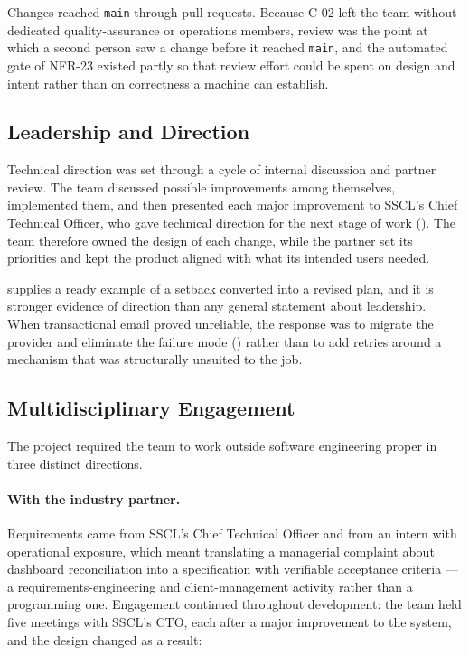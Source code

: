 Changes reached \texttt{main} through pull requests. Because C-02 left the team
without dedicated quality-assurance or operations members, review was the point
at which a second person saw a change before it reached \texttt{main}, and the
automated gate of NFR-23 existed partly so that review effort could be spent on
design and intent rather than on correctness a machine can establish.

\subsection{Leadership and Direction}
\label{subsec:leadership}

Technical direction was set through a cycle of internal discussion and partner
review. The team discussed possible improvements among themselves, implemented
them, and then presented each major improvement to SSCL's Chief Technical
Officer, who gave technical direction for the next stage of work
(). The team therefore owned the design of each
change, while the partner set its priorities and kept the product aligned with
what its intended users needed.

 supplies a ready example of a setback converted into a
revised plan, and it is stronger evidence of direction than any general
statement about leadership. When transactional email proved unreliable, the
response was to migrate the provider and eliminate the failure mode
() rather than to add retries around a mechanism
that was structurally unsuited to the job.

\subsection{Multidisciplinary Engagement}
\label{subsec:multidisciplinary}

The project required the team to work outside software engineering proper in
three distinct directions.

\paragraph{With the industry partner.} Requirements came from SSCL's Chief
Technical Officer and from an intern with operational exposure, which meant
translating a managerial complaint about dashboard reconciliation into a
specification with verifiable acceptance criteria --- a requirements-engineering
and client-management activity rather than a programming one. Engagement
continued throughout development: the team held five meetings with SSCL's CTO,
each after a major improvement to the system, and the design changed as a
result:


